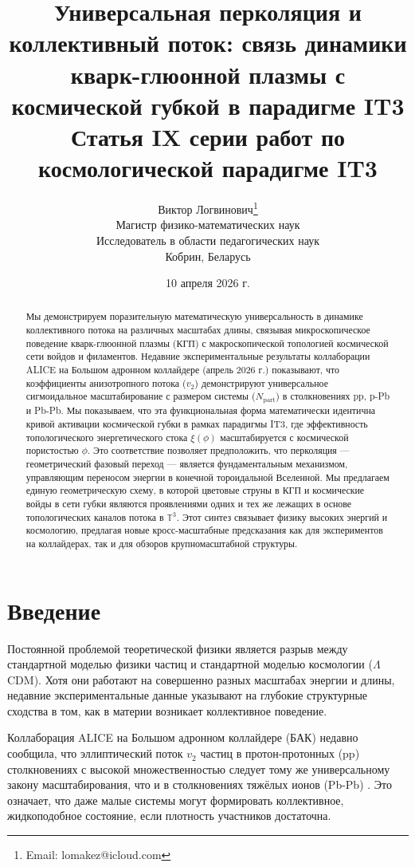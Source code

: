 \documentclass[12pt,a4paper]{article}
\title{\textbf{Универсальная перколяция и коллективный поток: связь динамики кварк-глюонной плазмы с космической губкой в парадигме IT3}\\[0.5cm]
\large Статья IX серии работ по космологической парадигме IT3}
\author{Виктор Логвинович\thanks{Email: lomakez@icloud.com}\\
Магистр физико-математических наук\\
Исследователь в области педагогических наук\\
Кобрин, Беларусь}
\date{10 апреля 2026 г.}
\begin{document}
\maketitle

\begin{abstract}
Мы демонстрируем поразительную математическую универсальность в динамике коллективного потока на различных масштабах длины, связывая микроскопическое поведение кварк-глюонной плазмы (КГП) с макроскопической топологией космической сети войдов и филаментов. Недавние экспериментальные результаты коллаборации ALICE на Большом адронном коллайдере (апрель 2026 г.) показывают, что коэффициенты анизотропного потока ($v_2$) демонстрируют универсальное сигмоидальное масштабирование с размером системы ($N_{\mathrm{part}}$) в столкновениях pp, p-Pb и Pb-Pb. Мы показываем, что эта функциональная форма математически идентична кривой активации космической губки в рамках парадигмы IT3, где эффективность топологического энергетического стока $\xi(\phi)$ масштабируется с космической пористостью $\phi$. Это соответствие позволяет предположить, что перколяция — геометрический фазовый переход — является фундаментальным механизмом, управляющим переносом энергии в конечной тороидальной Вселенной. Мы предлагаем единую геометрическую схему, в которой цветовые струны в КГП и космические войды в сети губки являются проявлениями одних и тех же лежащих в основе топологических каналов потока в $\mathbb{T}^3$. Этот синтез связывает физику высоких энергий и космологию, предлагая новые кросс-масштабные предсказания как для экспериментов на коллайдерах, так и для обзоров крупномасштабной структуры.
\end{abstract}

\section{Введение}

Постоянной проблемой теоретической физики является разрыв между стандартной моделью физики частиц и стандартной моделью космологии ($\Lambda$CDM). Хотя они работают на совершенно разных масштабах энергии и длины, недавние экспериментальные данные указывают на глубокие структурные сходства в том, как в материи возникает коллективное поведение.

Коллаборация ALICE на Большом адронном коллайдере (БАК) недавно сообщила, что эллиптический поток $v_2$ частиц в протон-протонных (pp) столкновениях с высокой множественностью следует тому же универсальному закону масштабирования, что и в столкновениях тяжёлых ионов (Pb-Pb) \citep{ALICE2026}. Это означает, что даже малые системы могут формировать коллективное, жидкоподобное состояние, если плотность участников достаточна.
\end{document}
